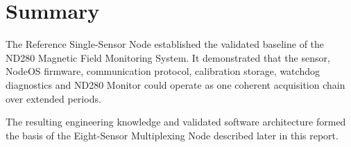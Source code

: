 \section{Summary}

The Reference Single-Sensor Node established the validated baseline of the ND280 Magnetic Field Monitoring System. It demonstrated that the sensor, NodeOS firmware, communication protocol, calibration storage, watchdog diagnostics and ND280 Monitor could operate as one coherent acquisition chain over extended periods.

The resulting engineering knowledge and validated software architecture formed the basis of the Eight-Sensor Multiplexing Node described later in this report.
